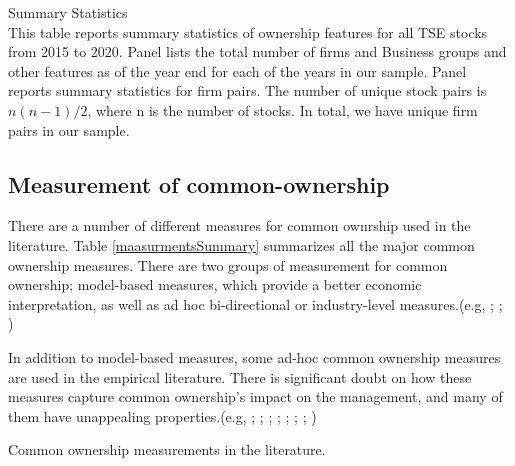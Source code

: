	
				
		\captionsetup[subtable]{labelformat=parens}
			\renewcommand{\thesubtable}{\Alph{subtable}}
			 \begin{table}[htbp]
			 \caption{ Summary Statistics \\ \small
			 This table reports summary statistics of ownership features for all TSE stocks from 2015 to 2020. Panel  lists the total number of firms and Business groups and other features as of the year end for each of the years in our sample. Panel  reports summary statistics for firm pairs. The number of unique stock pairs is $ n(n-1)/2 $, where n is the number of stocks. In total, we have \myname unique firm pairs in our sample.  }
			\label{st1}
			\centering
			\label{t2-1}
			\resizebox{1\textwidth}{!}
			{
				
			}
			
		\centering
	\bigskip
		\label{t2-2}
		\resizebox{1\textwidth}{!}
		{
			
		}
	\end{table}
	
	\captionsetup[subtable]{labelformat=empty}

	
	
	


\FloatBarrier


\subsection{{Measurement of common-ownership}}


There are a number of different measures for common ownrship used in the literature. Table \ref{maasurmentsSummary} summarizes all the major common ownership measures. There are two groups of measurement for common ownership; model-based measures, which provide a better economic interpretation, as well as ad hoc bi-directional or industry-level measures.(e.g, \cite{harford2011institutional}; \cite{azar2018anticompetitive}; \cite{gilje2020s})

In addition to model-based measures, some ad-hoc common ownership measures are used in the empirical literature. There is significant doubt on how these measures capture common ownership's impact on the management, and many of them have unappealing properties.(e.g, \cite{AntonPolk}; \cite{azar2011new}; \cite{freeman2019effects}; \cite{hansen1996externalities};  \cite{he2017product}; \cite{he2019internalizing}; \cite{lewellen2021does}; \cite{newham2018common})
	{\begin{table}[htbp]
			\centering
			\scriptsize
			\caption{ Common ownership measurements in the literature.}
			\label{maasurmentsSummary}
			\resizebox{\textwidth}{!}{
				
			}
		\end{table}
	}
	

